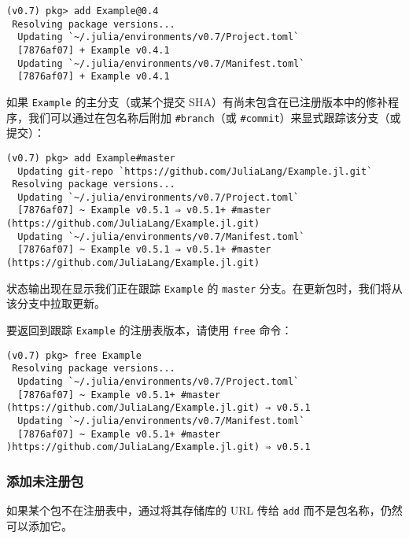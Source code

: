 \begin{lstlisting}
(v0.7) pkg> add Example@0.4
 Resolving package versions...
  Updating `~/.julia/environments/v0.7/Project.toml`
  [7876af07] + Example v0.4.1
  Updating `~/.julia/environments/v0.7/Manifest.toml`
  [7876af07] + Example v0.4.1
\end{lstlisting}



如果 \texttt{Example} 的主分支（或某个提交 SHA）有尚未包含在已注册版本中的修补程序，我们可以通过在包名称后附加 \texttt{\#branch}（或 \texttt{\#commit}）来显式跟踪该分支（或提交）：




\begin{lstlisting}
(v0.7) pkg> add Example#master
  Updating git-repo `https://github.com/JuliaLang/Example.jl.git`
 Resolving package versions...
  Updating `~/.julia/environments/v0.7/Project.toml`
  [7876af07] ~ Example v0.5.1 ⇒ v0.5.1+ #master (https://github.com/JuliaLang/Example.jl.git)
  Updating `~/.julia/environments/v0.7/Manifest.toml`
  [7876af07] ~ Example v0.5.1 ⇒ v0.5.1+ #master (https://github.com/JuliaLang/Example.jl.git)
\end{lstlisting}



状态输出现在显示我们正在跟踪 \texttt{Example} 的 \texttt{master} 分支。在更新包时，我们将从该分支中拉取更新。



要返回到跟踪 \texttt{Example} 的注册表版本，请使用 \texttt{free} 命令：




\begin{lstlisting}
(v0.7) pkg> free Example
 Resolving package versions...
  Updating `~/.julia/environments/v0.7/Project.toml`
  [7876af07] ~ Example v0.5.1+ #master (https://github.com/JuliaLang/Example.jl.git) ⇒ v0.5.1
  Updating `~/.julia/environments/v0.7/Manifest.toml`
  [7876af07] ~ Example v0.5.1+ #master )https://github.com/JuliaLang/Example.jl.git) ⇒ v0.5.1
\end{lstlisting}



\hypertarget{16019413810897191556}{}


\subsubsection{添加未注册包}



如果某个包不在注册表中，通过将其存储库的 URL 传给 \texttt{add} 而不是包名称，仍然可以添加它。




